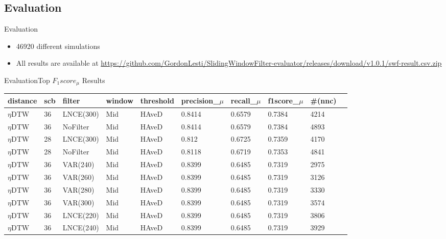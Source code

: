 \subsection{Evaluation}

\begin{frame}{Evaluation}
    \begin{itemize}
        \item 46920 different simulations
        \pause
        \item All results are available at \url{https://github.com/GordonLesti/SlidingWindowFilter-evaluator/releases/download/v1.0.1/swf-result.csv.zip}
    \end{itemize}
\end{frame}

\begin{frame}{Evaluation}{Top $F_{1}score_{\mu}$ Results}
    \begin{center}
        \tiny
        \begin{tabular}{llllllllll}
            \textbf{distance} & \textbf{scb} & \textbf{filter} & \textbf{window} & \textbf{threshold} & \textbf{precision\_$\mu$} & \textbf{recall\_$\mu$} & \textbf{f1score\_$\mu$} & \textbf{\#(nnc)}\\
            \hline
            $\eta$DTW & 36 & LNCE(300) & Mid  & HAveD & 0.8414 & 0.6579 & 0.7384 & 4214\\
            $\eta$DTW & 36 & NoFilter & Mid  & HAveD & 0.8414 & 0.6579 & 0.7384 & 4893\\
            $\eta$DTW & 28 & LNCE(300) & Mid  & HAveD & 0.812 & 0.6725 & 0.7359 & 4170\\
            $\eta$DTW & 28 & NoFilter & Mid  & HAveD & 0.8118 & 0.6719 & 0.7353 & 4841\\
            $\eta$DTW & 36 & VAR(240) & Mid  & HAveD & 0.8399 & 0.6485 & 0.7319 & 2975\\
            $\eta$DTW & 36 & VAR(260) & Mid & HAveD & 0.8399 & 0.6485 & 0.7319 & 3126\\
            $\eta$DTW & 36 & VAR(280) & Mid & HAveD & 0.8399 & 0.6485 & 0.7319 & 3330\\
            $\eta$DTW & 36 & VAR(300) & Mid & HAveD & 0.8399 & 0.6485 & 0.7319 & 3574\\
            $\eta$DTW & 36 & LNCE(220) & Mid & HAveD & 0.8399 & 0.6485 & 0.7319 & 3806\\
            $\eta$DTW & 36 & LNCE(240) & Mid & HAveD & 0.8399 & 0.6485 & 0.7319 & 3929
        \end{tabular}
    \end{center}
\end{frame}


